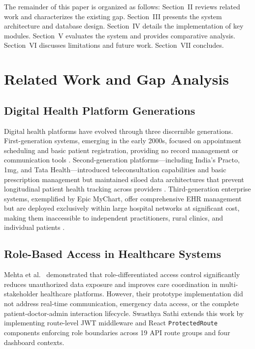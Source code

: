 \documentclass[conference]{IEEEtran}
\begin{document}
The remainder of this paper is organized as follows: Section~II reviews related work and characterizes the existing gap. Section~III presents the system architecture and database design. Section~IV details the implementation of key modules. Section~V evaluates the system and provides comparative analysis. Section~VI discusses limitations and future work. Section~VII concludes.

\section{Related Work and Gap Analysis}

\subsection{Digital Health Platform Generations}

Digital health platforms have evolved through three discernible generations. First-generation systems, emerging in the early 2000s, focused on appointment scheduling and basic patient registration, providing no record management or communication tools \cite{lun2005}. Second-generation platforms—including India's Practo, 1mg, and Tata Health—introduced teleconsultation capabilities and basic prescription management but maintained siloed data architectures that prevent longitudinal patient health tracking across providers \cite{praveen2020}. Third-generation enterprise systems, exemplified by Epic MyChart, offer comprehensive EHR management but are deployed exclusively within large hospital networks at significant cost, making them inaccessible to independent practitioners, rural clinics, and individual patients \cite{epic2021}.

\subsection{Role-Based Access in Healthcare Systems}

Mehta et al.~\cite{mehta2019} demonstrated that role-differentiated access control significantly reduces unauthorized data exposure and improves care coordination in multi-stakeholder healthcare platforms. However, their prototype implementation did not address real-time communication, emergency data access, or the complete patient-doctor-admin interaction lifecycle. Swasthya Sathi extends this work by implementing route-level JWT middleware and React \texttt{ProtectedRoute} components enforcing role boundaries across 19 API route groups and four dashboard contexts.
\end{document}
